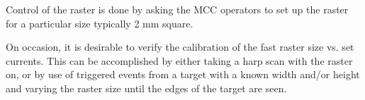 {Control of the raster is done by asking the MCC
operators to set up the raster for a particular size
typically 2 mm square.

On occasion, it is desirable to verify the calibration
of the fast raster size vs. set currents. This can be accomplished
by either taking a harp scan with the raster on, or by use
of triggered events from a target with a known width and/or height and
varying the raster size until the edges of the target are seen.


}


%
%
%
